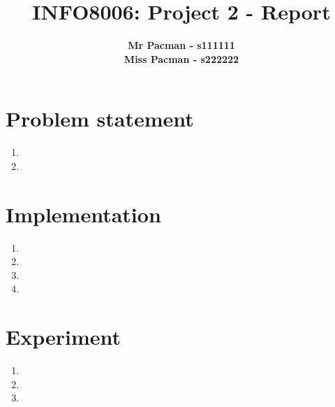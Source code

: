 \documentclass{article}
\begin{document}

\title{\Large{INFO8006: Project 2 - Report}}
\vspace{1cm}
\author{\small{\bf Mr Pacman - s111111} \\ \small{\bf Miss Pacman - s222222}}

\maketitle


\section{Problem statement}

\begin{enumerate}[label=\alph*.]
    	\item
	\item
\end{enumerate}

\section{Implementation}

\begin{enumerate}[label=\alph*.]
	\item
   	\item
    	\item
    	\item
\end{enumerate}

\section{Experiment}

\begin{enumerate}[label=\alph*.]
    \item
    \item
    \item
\end{enumerate}



\end{document}

